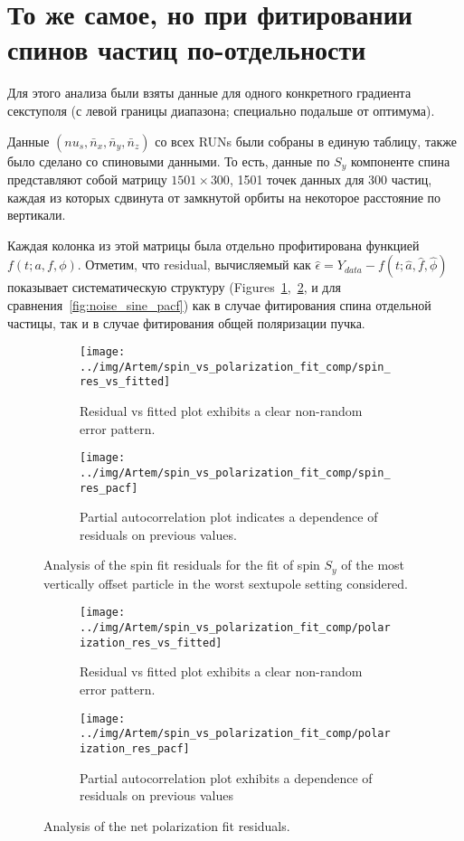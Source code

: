 \documentclass{report}
\begin{document}
\section{То же самое, но при фитировании спинов частиц по-отдельности}
Для этого анализа были взяты данные для одного конкретного градиента секступоля (с левой границы диапазона; специально подальше от оптимума).

Данные $(nu_s, \bar n_x, \bar n_y, \bar n_z)$ со всех RUNs были собраны в единую таблицу, также было сделано со спиновыми данными. То есть, данные по $S_y$ компоненте спина представляют собой матрицу $1501\times 300$, 1501 точек данных для 300 частиц, каждая из которых сдвинута от замкнутой орбиты на некоторое расстояние по вертикали.

Каждая колонка из этой матрицы была отдельно профитирована функцией $f(t; a,f,\phi)$. Отметим, что residual, вычисляемый как $\hat\epsilon = Y_{data} - f(t;\hat a, \hat f, \hat\phi)$ показывает систематическую структуру (Figures~\ref{fig:spin_residual},~\ref{fig:polarization_residual}, и для сравнения~\ref{fig:noise_sine_pacf}) как в случае фитирования спина отдельной частицы, так и в случае фитирования общей поляризации пучка.

\begin{figure}[H]
  \centering
  \begin{subfigure}[b]{\textwidth}
    \texttt{[image: ../img/Artem/spin\_vs\_polarization\_fit\_comp/spin\_res\_vs\_fitted]}
    \caption{Residual vs fitted plot exhibits a clear non-random error pattern.}
  \end{subfigure}

  \begin{subfigure}[b]{\textwidth}
      \texttt{[image: ../img/Artem/spin\_vs\_polarization\_fit\_comp/spin\_res\_pacf]}
      \caption{Partial autocorrelation plot indicates a dependence of residuals on previous values.}
  \end{subfigure}
  \caption{Analysis of the spin fit residuals for the fit of spin $S_y$ of the most vertically offset particle in the worst sextupole setting considered.\label{fig:spin_residual}}
\end{figure}

\begin{figure}[H]
  \centering
  \begin{subfigure}[b]{\textwidth}
    \texttt{[image: ../img/Artem/spin\_vs\_polarization\_fit\_comp/polarization\_res\_vs\_fitted]}
    \caption{Residual vs fitted plot exhibits a clear non-random error pattern.}
  \end{subfigure}

  \begin{subfigure}[b]{\textwidth}
      \texttt{[image: ../img/Artem/spin\_vs\_polarization\_fit\_comp/polarization\_res\_pacf]}
      \caption{Partial autocorrelation plot exhibits a dependence of residuals on previous values}
  \end{subfigure}
  \caption{Analysis of the net polarization fit residuals.\label{fig:polarization_residual}}
\end{figure}
\end{document}
